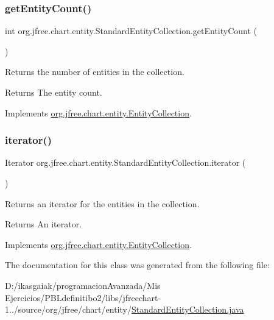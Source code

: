 \subsubsection{\texorpdfstring{get\+Entity\+Count()}{getEntityCount()}}
{\footnotesize\ttfamily int org.\+jfree.\+chart.\+entity.\+Standard\+Entity\+Collection.\+get\+Entity\+Count (\begin{DoxyParamCaption}{ }\end{DoxyParamCaption})}

Returns the number of entities in the collection.

\begin{DoxyReturn}{Returns}
The entity count. 
\end{DoxyReturn}


Implements \mbox{\hyperlink{interfaceorg_1_1jfree_1_1chart_1_1entity_1_1_entity_collection_a7137111d39cd14123986f57e4e1d209c}{org.\+jfree.\+chart.\+entity.\+Entity\+Collection}}.

\mbox{\label{classorg_1_1jfree_1_1chart_1_1entity_1_1_standard_entity_collection_add3c9d1d34e8cfa4225356a2a01e9248}} 
\subsubsection{\texorpdfstring{iterator()}{iterator()}}
{\footnotesize\ttfamily Iterator org.\+jfree.\+chart.\+entity.\+Standard\+Entity\+Collection.\+iterator (\begin{DoxyParamCaption}{ }\end{DoxyParamCaption})}

Returns an iterator for the entities in the collection.

\begin{DoxyReturn}{Returns}
An iterator. 
\end{DoxyReturn}


Implements \mbox{\hyperlink{interfaceorg_1_1jfree_1_1chart_1_1entity_1_1_entity_collection_a69ebb556987750e02a98f978e26fa4e7}{org.\+jfree.\+chart.\+entity.\+Entity\+Collection}}.



The documentation for this class was generated from the following file\+:\begin{DoxyCompactItemize}
\item 
D\+:/ikasgaiak/programacion\+Avanzada/\+Mis Ejercicios/\+P\+B\+Ldefinitibo2/libs/jfreechart-\/1../source/org/jfree/chart/entity/\mbox{\hyperlink{_standard_entity_collection_8java}{Standard\+Entity\+Collection.\+java}}\end{DoxyCompactItemize}
